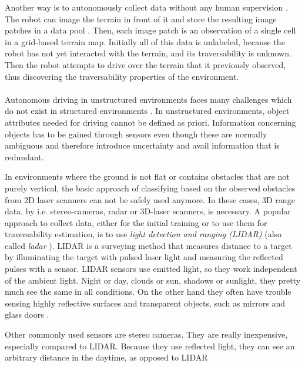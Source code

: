 \documentclass[12pt,a4paper,table,dvipsnames,tikz]{report}
\newcommand{\term}{\textit}
\newcommand{\acronym}{\MakeUppercase}
\begin{document}
	Another way is to autonomously collect data without any human supervision 
	\citep{Kim, Lee}. The robot can image the terrain in front of it and store the 
	resulting image patches in a data pool \citep{Kim}. Then, each image patch is an 
	observation of a single cell in a grid-based terrain map. Initially all of this 
	data is unlabeled, because the robot has not yet interacted with the terrain, and 
	its traversability is unknown. Then the robot attempts to drive over the 
	terrain that it previously observed, thus discovering the traversability 
	properties of the environment.
	\\\\
	
	
	Autonomous driving in unstructured environments faces many challenges which do 
	not exist in structured environments \citep{Shabbir}. In unstructured environments, 
	object attributes needed for driving cannot be defined as priori. Information 
	concerning objects has to be gained through sensors even though these are normally 
	ambiguous and therefore introduce uncertainty and avail information that is 
	redundant.
	\par
	In environments where the ground is not flat or contains obstacles that are 
	not purely vertical, the basic approach of classifying based on the observed 
	obstacles from \acronym{2d} laser scanners can not be safely used anymore. 
	In these cases, \acronym{3d} range data, by i.e. stereo-cameras, radar or 
	\acronym{3d}-laser scanners, is necessary. A popular approach to collect data, 
	either for the initial training or to use them for traversability estimation, is to use 
	\term{light detection and ranging (\acronym{lidar})} \citep{Suger, Lalonde} (also 
	called \term{ladar} \citep{Lalonde, Shneier}). \acronym{lidar} is a surveying 
	method that measures distance to a target by illuminating the target with pulsed 
	laser light and measuring the reflected pulses with a sensor. \acronym{lidar} 
	sensors use emitted light, so they work independent of the ambient light. Night 
	or day, clouds or sun, shadows or sunlight, they pretty much see the same in all 
	conditions. On the other hand they often have trouble sensing highly reflective 
	surfaces and transparent objects, such as mirrors and glass doors 
	\citep{HiroseGonet}.
	\par
	Other commonly used sensors are stereo cameras. They are really inexpensive, 
	especially compared to \acronym{lidar}. Because they use reflected light, they 
	can see an arbitrary distance in the daytime, as opposed to \acronym{lidar} 
\end{document}

